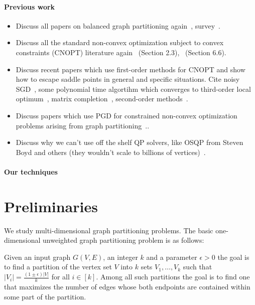 \paragraph{Previous work}
\begin{itemize}
\item Discuss all papers on balanced graph partitioning again~\cite{KK95, DGRW12, UB13, TGRV14, ABM16,  DKKOPS16, MLLS17, KKPPSAP17}, survey~\cite{BMSSS16}.
\item Discuss all the standard non-convex optimization subject to convex constraints (CNOPT) literature again~\cite{B99} (Section 2.3),~\cite{JK17} (Section 6.6).
\item Discuss recent papers which use first-order methods for CNOPT and show how to escape saddle points in general and specific situations. Cite noisy SGD~\cite{GHJY15}, some polynomial time algortihm which converges to third-order local optimum~\cite{AG16}, matrix completion~\cite{GLM16}, second-order methods~\cite{SQW15}.
\item Discuss papers which use PGD for constrained non-convex optimization problems arising from graph partitioning~\cite{LRSST10}..
\item Discuss why we can't use off the shelf QP solvers, like OSQP from Steven Boyd and others (they wouldn't scale to billions of vertices)~\cite{SBGBB17}.
\end{itemize}

\paragraph{Our techniques}



\section{Preliminaries}\label{sec:mdbgp-definitions}

We study multi-dimensional graph partitioning problems. The basic one-dimensional unweighted graph partitioning problem is as follows: 

\begin{definition}
	Given an input graph $G(V, E)$, an integer $k$ and a parameter $\epsilon > 0$ the goal is to find a partition of the vertex set $V$ into $k$ sets $V_1, \dots, V_k$ such that $|V_i| = \frac{(1\pm \epsilon) |V|}{k}$ for all $i \in [k]$. Among all such partitions the goal is to find one that maximizes the number of edges whose both endpoints are contained within some part of the partition. 
\end{definition}

